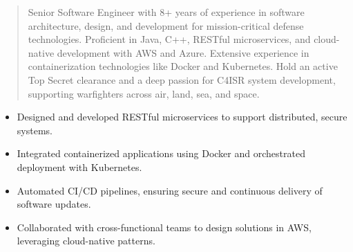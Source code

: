 



\makecvheader

\begin{quote}
  \noindent
  Senior Software Engineer with 8+ years of experience in software architecture, design, and development for mission-critical defense technologies. Proficient in Java, C++, RESTful microservices, and cloud-native development with AWS and Azure. Extensive experience in containerization technologies like Docker and Kubernetes. Hold an active Top Secret clearance and a deep passion for C4ISR system development, supporting warfighters across air, land, sea, and space.
\end{quote}

\par\smallskip
\noindent
\begin{minipage}{20cm}
  \begin{minipage}{9.75cm}
    \begin{itemize}
      \item Designed and developed RESTful microservices to support distributed, secure systems.
      \item Integrated containerized applications using Docker and orchestrated deployment with Kubernetes.
    \end{itemize}
  \end{minipage}
  \hfill
  \begin{minipage}{9.75cm}
    \begin{itemize}
      \item Automated CI/CD pipelines, ensuring secure and continuous delivery of software updates.
      \item Collaborated with cross-functional teams to design solutions in AWS, leveraging cloud-native patterns.
    \end{itemize}
  \end{minipage}
\end{minipage}
\par\smallskip
\divider

